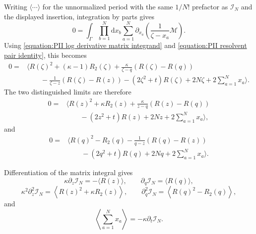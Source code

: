 \documentclass[a4paper,11pt]{article}
\newcommand{\dd}{\mathrm{d}}
\numberwithin{equation}{section}
\begin{document}
Writing $\langle\cdots\rangle$ for the unnormalized period with the
same $1/N!$ prefactor as $\mathcal{I}_{N}$ and the displayed insertion,
integration by parts gives
\begin{equation}
	0
	=
	\int_{\Gamma}
	\prod_{b=1}^{N}\dd x_{b}
	\sum_{a=1}^{N}
	\partial_{x_{a}}
	\left(
	\frac{1}{\zeta-x_{a}}\mathcal{M}
	\right).
\end{equation}
Using \eqref{equation:PII log derivative matrix integrand} and
\eqref{equation:PII resolvent pair identity}, this becomes
\begin{equation}
	\begin{aligned}
		0
		={}&
		\Bigg\langle
		R(\zeta)^{2}
		+(\kappa-1)R_{2}(\zeta)
		+\frac{\kappa}{\zeta-q}
		\left(
		R(\zeta)-R(q)
		\right)
		\\
		&\qquad
		-\frac{1}{\zeta-z}
		\left(
		R(\zeta)-R(z)
		\right)
		-(2\zeta^{2}+t)R(\zeta)
		+2N\zeta
		+2\sum_{a=1}^{N}x_{a}
		\Bigg\rangle.
	\end{aligned}
\end{equation}
The two distinguished limits are therefore
\begin{equation}
	\label{equation:PII z loop equation}
	\begin{aligned}
		0
		={}&
		\Bigg\langle
		R(z)^{2}
		+\kappa R_{2}(z)
		+\frac{\kappa}{z-q}
		\left(
		R(z)-R(q)
		\right)
		\\
		&\qquad
		-(2z^{2}+t)R(z)
		+2Nz
		+2\sum_{a=1}^{N}x_{a}
		\Bigg\rangle,
	\end{aligned}
\end{equation}
and
\begin{equation}
	\label{equation:PII q loop equation}
	\begin{aligned}
		0
		={}&
		\Bigg\langle
		R(q)^{2}
		-R_{2}(q)
		-\frac{1}{q-z}
		\left(
		R(q)-R(z)
		\right)
		\\
		&\qquad
		-(2q^{2}+t)R(q)
		+2Nq
		+2\sum_{a=1}^{N}x_{a}
		\Bigg\rangle.
	\end{aligned}
\end{equation}

Differentiation of the matrix integral gives
\begin{equation}
	\label{equation:PII matrix integral derivative identities}
	\kappa\partial_{z}\mathcal{I}_{N}
	=-\langle R(z)\rangle,
	\qquad
	\partial_{q}\mathcal{I}_{N}
	=\langle R(q)\rangle,
\end{equation}
\begin{equation}
	\kappa^{2}\partial_{z}^{2}\mathcal{I}_{N}
	=
	\left\langle
	R(z)^{2}+\kappa R_{2}(z)
	\right\rangle,
	\qquad
	\partial_{q}^{2}\mathcal{I}_{N}
	=
	\left\langle
	R(q)^{2}-R_{2}(q)
	\right\rangle,
\end{equation}
and
\begin{equation}
	\left\langle
	\sum_{a=1}^{N}x_{a}
	\right\rangle
	=-\kappa\partial_{t}\mathcal{I}_{N}.
\end{equation}
\end{document}
